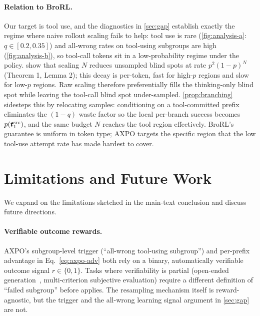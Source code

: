 \paragraph{Relation to BroRL.}
Our target is tool use, and the diagnostics in \autoref{sec:gap} establish exactly the regime where naive rollout scaling fails to help: tool use is rare (\autoref{fig:analysis-a}: $q \in [0.2, 0.35]$) and all-wrong rates on tool-using subgroups are high (\autoref{fig:analysis-b}), so tool-call tokens sit in a low-probability regime under the policy. \citet{brorl} show that scaling $N$ reduces unsampled blind spots at rate $p^2(1-p)^N$ (Theorem 1, Lemma 2); this decay is per-token, fast for high-$p$ regions and slow for low-$p$ regions. Raw scaling therefore preferentially fills the thinking-only blind spot while leaving the tool-call blind spot under-sampled. \autoref{prop:branching} sidesteps this by relocating samples: conditioning on a tool-committed prefix eliminates the $(1-q)$ waste factor so the local per-branch success becomes $p({\bm{t}}_1^{\text{src}})$, and the same budget $N$ reaches the tool region effectively. BroRL's guarantee is uniform in token type; AXPO targets the specific region that the low tool-use attempt rate has made hardest to cover.

\section{Limitations and Future Work}
\label{app:limitations}

We expand on the limitations sketched in the main-text conclusion and discuss future directions.

\paragraph{Verifiable outcome rewards.}
AXPO's subgroup-level trigger (``all-wrong tool-using subgroup'') and per-prefix advantage in Eq.~\ref{eq:axpo-adv} both rely on a binary, automatically verifiable outcome signal $r \in \{0,1\}$. Tasks where verifiability is partial (open-ended generation~\citep{NEURIPS2025_e5849736, lee2025maskingteacherreinforcingstudent}, multi-criterion subjective evaluation) require a different definition of ``failed subgroup'' before \toolresample applies. The resampling mechanism itself is reward-agnostic, but the trigger and the all-wrong learning signal argument in \autoref{sec:gap} are not.

